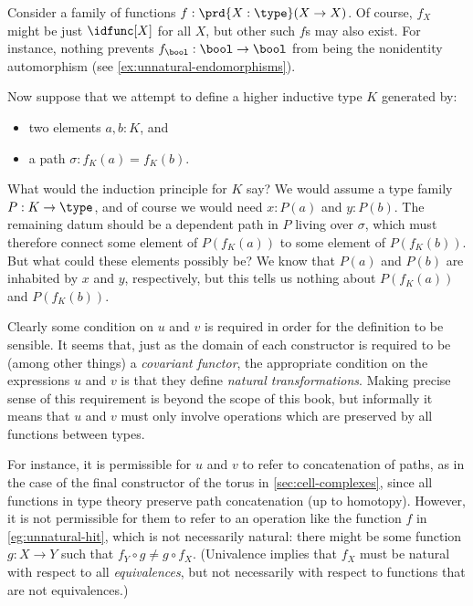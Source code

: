 \begin{eg}\label{eg:unnatural-hit}
  Consider a family of functions $f:\prd{X:\type} (X\to X)$.
  Of course, $f_X$ might be just $\idfunc[X]$ for all $X$, but other such $f$s may also exist.
  For instance, nothing prevents $f_{\bool}:\bool\to\bool$ from being the nonidentity automorphism (see \cref{ex:unnatural-endomorphisms}).

  Now suppose that we attempt to define a higher inductive type $K$ generated by:
  \begin{itemize}
  \item two elements $a,b:K$, and
  \item a path $\sigma:f_K(a)=f_K(b)$.
  \end{itemize}
  What would the induction principle for $K$ say?
  We would assume a type family $P:K\to\type$, and of course we would need $x:P(a)$ and $y:P(b)$.
  The remaining datum should be a dependent path in $P$ living over $\sigma$, which must therefore connect some element of $P(f_K(a))$ to some element of $P(f_K(b))$.
  But what could these elements possibly be?
  We know that $P(a)$ and $P(b)$ are inhabited by $x$ and $y$, respectively, but this tells us nothing about $P(f_K(a))$ and $P(f_K(b))$.
\end{eg}

Clearly some condition on $u$ and $v$ is required in order for the definition to be sensible.
It seems that, just as the domain of each constructor is required to be (among other things) a \emph{covariant functor}, the appropriate condition on the expressions $u$ and $v$ is that they define \emph{natural transformations}.
Making precise sense of this requirement is beyond the scope of this book, but informally it means that $u$ and $v$ must only involve operations which are preserved by all functions between types.

For instance, it is permissible for $u$ and $v$ to refer to concatenation of paths, as in the case of the final constructor of the torus in \cref{sec:cell-complexes}, since all functions in type theory preserve path concatenation (up to homotopy).
However, it is not permissible for them to refer to an operation like the function $f$ in \cref{eg:unnatural-hit}, which is not necessarily natural: there might be some function $g:X\to Y$ such that $f_Y \circ g \neq g\circ f_X$.
(Univalence implies that $f_X$ must be natural with respect to all \emph{equivalences}, but not necessarily with respect to functions that are not equivalences.)

